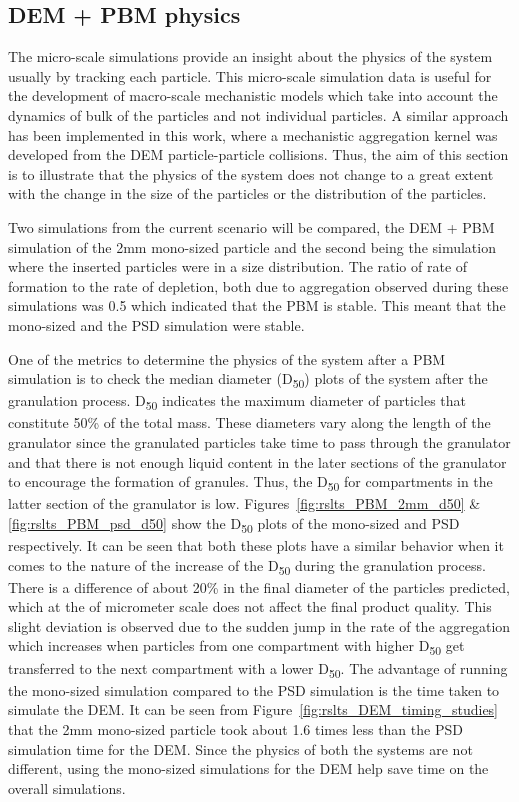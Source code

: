 \documentclass[preprint,11pt,authoryear]{elsarticle}
\begin{document}
\subsection{DEM + PBM physics}
The micro-scale simulations provide an insight about the physics of the system usually by tracking 
each particle. This micro-scale simulation data is useful for the development of macro-scale 
mechanistic models which take into account the dynamics of bulk of the particles and not individual 
particles. A similar approach has been implemented in this work, where a mechanistic aggregation 
kernel was developed from the DEM particle-particle collisions. Thus, the aim of this section is to 
illustrate that the physics of the system does not change to a great extent with the change in the size 
of the particles or the distribution of the particles.

Two simulations from the current scenario will be compared, the DEM + PBM simulation of the 2mm 
mono-sized particle and the second being the simulation where the inserted particles were in a size 
distribution. The ratio of rate of formation to the rate of depletion, both due to aggregation 
observed during these simulations was 0.5 which indicated that the PBM is stable. This meant that the
mono-sized and the PSD simulation were stable.

One of the metrics to determine the physics of the system after a PBM simulation is to check the 
median diameter (D\textsubscript{50}) plots of the system after the granulation process. 
D\textsubscript{50} indicates the maximum diameter of particles that constitute 50\% of the total mass. 
These diameters vary along the length of the granulator since the granulated particles take time to 
pass through the granulator and that there is not enough liquid content in the later sections of 
the granulator to encourage the formation of granules. Thus, the D\textsubscript{50} for compartments 
in the latter section of the granulator is low. Figures~\ref{fig:rslts_PBM_2mm_d50} \& \ref{fig:rslts_PBM_psd_d50} show the D\textsubscript{50} plots of the mono-sized and PSD respectively. 
It can be seen that both these plots have a similar behavior when it comes to the nature of the 
increase of the D\textsubscript{50} during the granulation process. There is a difference of about 
20\% in the final diameter of the particles predicted, which at the of micrometer scale does not affect 
the final product quality. This slight deviation is observed due to the sudden jump in the 
rate of the aggregation which increases when particles from one compartment with higher 
D\textsubscript{50} get transferred to the next compartment with a lower D\textsubscript{50}. 
The advantage of running the mono-sized simulation compared to the PSD simulation is the 
time taken to simulate the DEM. It can be seen from Figure~\ref{fig:rslts_DEM_timing_studies} that 
the 2mm mono-sized particle took about 1.6 times less than the PSD simulation time for the DEM. 
Since the physics of both the systems are not different, using the mono-sized simulations 
for the DEM help save time on the overall simulations. 
\end{document}
